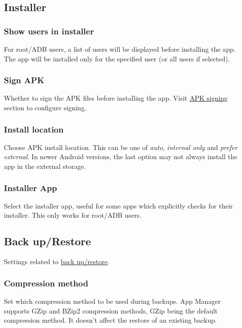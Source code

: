 \subsection{Installer}\label{subsec:installer} %

\subsubsection{Show users in installer} %
For root/ADB users, a list of users will be displayed before installing the app.
The app will be installed only for the specified user (or all users if selected).

\subsubsection{Sign APK} %
Whether to sign the APK files before installing the app.
Visit \hyperref[subsec:apk-signing]{APK signing} section to configure signing.

\subsubsection{Install location} %
Choose APK install location.
This can be one of \textit{auto}, \textit{internal only} and \textit{prefer external}.
In newer Android versions, the last option may not always install the app in the external storage.

\subsubsection{Installer App} %
Select the installer app, useful for some apps which explicitly checks for their installer.
This only works for root/ADB users.

\subsection{Back up/Restore}\label{subsec:backup/restore} %
Settings related to \hyperref[sec:backup-restore]{back up/restore}.

\subsubsection{Compression method} %
Set which compression method to be used during backups.
App Manager supports GZip and BZip2 compression methods, GZip being the default compression method.
It doesn't affect the restore of an existing backup.

